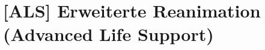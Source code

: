 \chapter{[ALS] Erweiterte Reanimation (Advanced Life Support)}
\label{chp:ALS}

\minitoc

% 
% 
% 
% 
% 
% 
% 
% 
% 
% 
% 
% 
